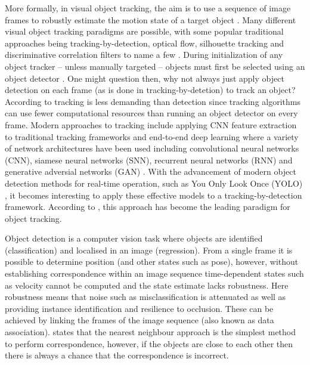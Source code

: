 \documentclass[a4paper,twoside,12pt]{report}
\begin{document}
More formally, in visual object tracking, the aim is to use a sequence of image frames to robustly estimate the motion state of a target object \citep{track1}. Many different visual object tracking paradigms are possible, with some popular traditional approaches being tracking-by-detection, optical flow, silhouette tracking and discriminative correlation filters to name a few \citep{track0}. During initialization of any object tracker -- unless manually targeted -- objects must first be selected using an object detector \citep{tradtrack0}. One might question then, why not always just apply object detection on each frame (as is done in tracking-by-detetion) to track an object? According to \cite{tradtrack5} tracking is less demanding than detection since tracking algorithms can use fewer computational resources than running an object detector on every frame. Modern approaches to tracking include applying CNN feature extraction to traditional tracking frameworks and end-to-end deep learning where a variety of network architectures have been used including convolutional neural networks (CNN), siamese neural networks (SNN), recurrent neural networks (RNN) and generative adversial networks (GAN) \citep{deeptrack1}. With the advancement of modern object detection methods for real-time operation, such as You Only Look Once (YOLO) \citep{yolo}, it becomes interesting to apply these effective models to a tracking-by-detection framework. According to \cite{deepsort}, this approach has become the leading paradigm for object tracking.

Object detection is a computer vision task where objects are identified (classification) and localised in an image (regression). From a single frame it is possible to determine position (and other states such as pose), however, without establishing correspondence within an image sequence time-dependent states such as velocity cannot be computed and the state estimate lacks robustness. Here robustness means that noise such as misclassification is attenuated as well as providing instance identification and resilience to occlusion. These can be achieved by linking the frames of the image sequence (also known as data association). \cite{tradtrack0} states that the nearest neighbour approach is the simplest method to perform correspondence, however, if the objects are close to each other then there is always a chance that the correspondence is incorrect.
\end{document}
